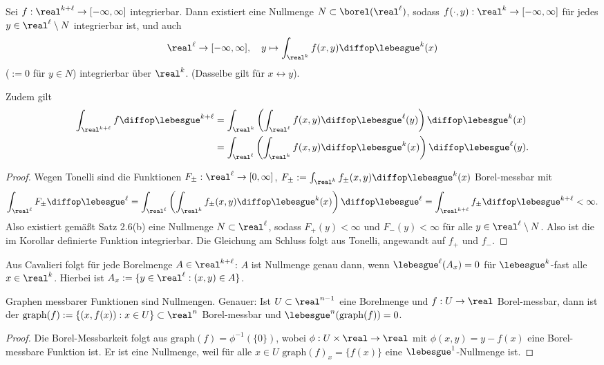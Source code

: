 \begin{kor}[Fubini]
 Sei $f:\real^{k+\ell} \to [-\infty,\infty]$ integrierbar. Dann existiert eine Nullmenge $N \subset \borel(\real^\ell)$, sodass $f(\cdot, y): \real^k \to [-\infty, \infty]$ für jedes $y \in \real^\ell \setminus N$ integrierbar ist, und auch 
 \[ \real^\ell \to [-\infty, \infty],\quad y \mapsto \int_{\real^k} f(x,y) \diffop \lebesgue^k (x) \]
 ($:= 0$ für $y \in N$) integrierbar über $\real^k$. (Dasselbe gilt für $x \leftrightarrow y$).
 
 Zudem gilt
 \[ \begin{aligned}
    \int_{\real^{k+\ell}} f \diffop \lebesgue^{k+\ell} 
    &= \int_{\real^k} \left( \int_{\real^\ell} f(x,y)  \diffop \lebesgue^\ell (y) \right) \diffop \lebesgue^k(x) \\
    &= \int_{\real^\ell} \left( \int_{\real^k} f(x,y)  \diffop \lebesgue^k (x) \right) \diffop \lebesgue^\ell(y).
    \end{aligned} \]
\end{kor}

\begin{proof}
 Wegen Tonelli sind die Funktionen $F_\pm: \real^\ell \to [0,\infty]$, $F_\pm := \int_{\real^k} f_\pm (x,y) \diffop \lebesgue^k(x)$ Borel-messbar mit 
 \[ \int_{\real^\ell} F_\pm \diffop \lebesgue^\ell = \int_{\real^\ell} \left( \int_{\real^k} f_\pm (x,y) \diffop \lebesgue^k(x) \right) \diffop \lebesgue^\ell = \int_{\real^{k+\ell}} f_\pm \diffop \lebesgue^{k+\ell} < \infty. \]
 Also existiert gemäßt Satz 2.6(b) eine Nullmenge $N \subset \real^\ell$, sodass $F_+(y) < \infty$ und $F_-(y) < \infty$ für alle $y \in \real^\ell \setminus N$. Also ist die im Korollar definierte Funktion integrierbar. Die Gleichung am Schluss folgt aus Tonelli, angewandt auf $f_+$ und $f_-$.
\end{proof}

\begin{exmp}
 Aus Cavalieri folgt für jede Borelmenge $A \in \real^{k+\ell}$: $A$ ist Nullmenge genau dann, wenn $\lebesgue^\ell( A_x ) = 0$ für $\lebesgue^k$-fast alle $x \in \real^k$. Hierbei ist $A_x := \{y \in \real^\ell:(x,y) \in A \}$.
\end{exmp}

\begin{folg}
 Graphen messbarer Funktionen sind Nullmengen. Genauer: Ist $U \subset \real^{n-1}$ eine Borelmenge und $f:U \to \real$ Borel-messbar, dann ist der $\mathrm{graph}(f) := \{ (x,f(x)) : x \in U \} \subset \real^n$ Borel-messbar und $\lebesgue^n (\mathrm{graph}(f) ) = 0$.
\end{folg}

\begin{proof}
 Die Borel-Messbarkeit folgt aus $\mathrm{graph}(f) = \phi^{-1}( \{ 0 \} )$, wobei $\phi: U \times \real \to \real$ mit $\phi(x,y) = y -f(x)$ eine Borel-messbare Funktion ist. Er ist eine Nullmenge, weil für alle $x \in U$ $\mathrm{graph}(f)_x = \{ f(x) \}$ eine $\lebesgue^1$-Nullmenge ist.
\end{proof}